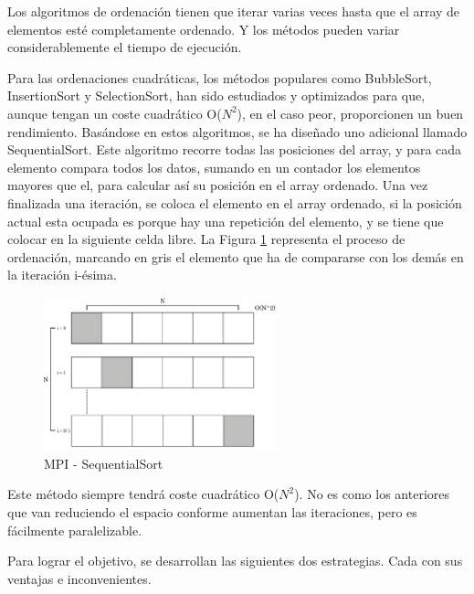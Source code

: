 	 


	
	
	Los algoritmos de ordenación tienen que iterar varias veces hasta que el array de elementos esté completamente ordenado. Y los métodos pueden variar considerablemente el tiempo de ejecución.
	
	Para las ordenaciones cuadráticas, los métodos populares como BubbleSort, InsertionSort y SelectionSort, han sido estudiados y optimizados para que, aunque tengan un coste cuadrático O(\(N^{2}\)), en el caso peor, proporcionen un buen rendimiento. Basándose en estos algoritmos, se ha diseñado uno adicional llamado SequentialSort. Este algoritmo recorre todas las posiciones del array, y para cada elemento compara todos los datos, sumando en un contador los elementos mayores que el, para calcular así su posición en el array ordenado. Una vez finalizada una iteración, se coloca el elemento en el array ordenado, si la posición actual esta ocupada es porque hay una repetición del elemento, y se tiene que colocar en la siguiente celda libre. La Figura \ref{fig:sequentialsortmpi} representa el proceso de ordenación, marcando en gris el elemento que ha de compararse con los demás en la iteración i-ésima.
	
	\newpage

	\begin{figure}[!h]
		\centering
		\includegraphics[width=0.6\textwidth]{images/chapter_3/sequentialsort_mpi}
		\caption{MPI - SequentialSort}
		\label{fig:sequentialsortmpi}
	\end{figure}
	
	Este método siempre tendrá coste cuadrático O(\(N^{2}\)). No es como los anteriores que van reduciendo el espacio conforme aumentan las iteraciones, pero es fácilmente paralelizable. 
	
	Para lograr el objetivo, se desarrollan las siguientes dos estrategias. Cada con sus ventajas e inconvenientes.
	
